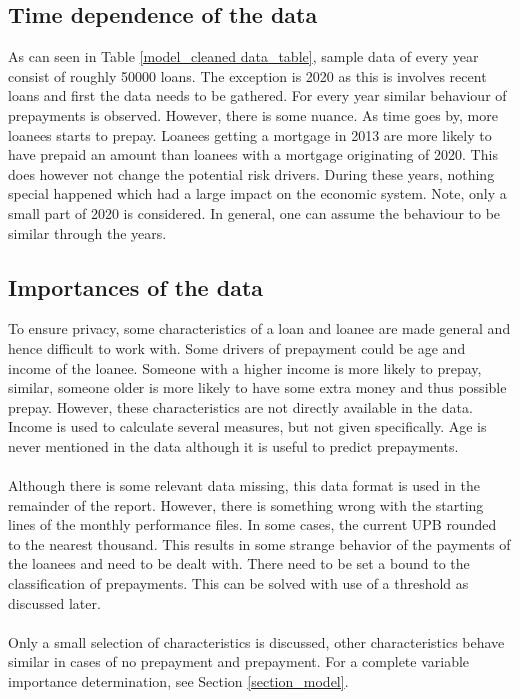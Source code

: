 \subsection{Time dependence of the data}
    As can seen in Table \ref{model_cleaned data_table}, sample data of 
    every year consist of roughly 50000 loans. The exception is 2020 as 
    this is involves recent loans and first the data needs to be 
    gathered. For every year similar behaviour of prepayments is 
    observed. However, there is some nuance. As time goes by, more 
    loanees starts to prepay. Loanees getting a mortgage in 2013 are 
    more likely to have prepaid an amount than loanees with a mortgage 
    originating of 2020. This does however not change the potential 
    risk drivers. During these years, nothing special happened which 
    had a large impact on the economic system. Note, only a small part 
    of 2020 is considered. In general, one can assume the behaviour 
    to be similar through the years.
    

\subsection{Importances of the data}
    To ensure privacy, some characteristics of a loan and loanee are 
    made general and hence difficult to work with. Some drivers of 
    prepayment could be age and income of the loanee. Someone with a 
    higher income is more likely to prepay, similar, someone older is 
    more likely to have some extra money and thus possible prepay. 
    However, these characteristics are not directly available in the 
    data. Income is used to calculate several measures, but not given 
    specifically. Age is never mentioned in the data although it is 
    useful to predict prepayments.  
    \\\\
    Although there is some relevant data missing, this data format is 
    used in the remainder of the report.  However, there is something 
    wrong with the starting lines of the monthly performance files. 
    In some cases, the current UPB rounded to the nearest thousand. 
    This results in some strange behavior of the payments of the 
    loanees and need to be dealt with. There need to be set a bound to 
    the classification of prepayments. This can be solved with use of a 
    threshold as discussed later. 
    \\\\
    Only a small selection of characteristics is discussed, other 
    characteristics behave similar in cases of no prepayment and 
    prepayment. For a complete variable importance determination, 
    see Section \ref{section_model}. 
    
